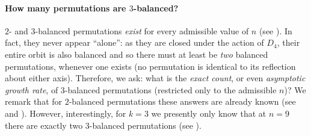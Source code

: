 \documentclass{article}
\newcommand{\threeb}{$3$-balanced\xspace}
\theoremstyle{remark}
\theoremstyle{plain}
\begin{document}
\paragraph{How many permutations are $3$-balanced?} $2$- and $3$-balanced permutations \textit{exist} for every admissible value of $n$ (see ). In fact, they never appear ``alone'': as they are closed under the action of $D_4$, their entire orbit is also balanced and so there must at least be \textit{two} balanced permutations, whenever one exists (no permutation is identical to its reflection about either axis). Therefore, we ask: what is the \textit{exact count}, or even \textit{asymptotic growth rate}, of $3$-balanced permutations (restricted only to the admissible $n$)? We remark that for $2$-balanced permutations these answers are already known (see \cite[A316775]{oeis} and \cite[A000140]{oeis}). However, interestingly, for $k=3$ we presently only know that at $n=9$ there are exactly two \threeb permutations (see ).
 

\end{document}
